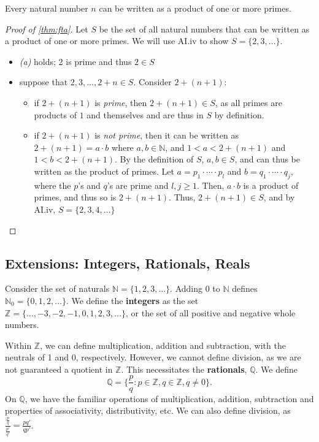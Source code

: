 \documentclass[12pt]{article}
\begin{document}
\begin{theorem}\label{thm:fta}
  Every natural number $n$ can be written as a product of one or more primes. \footnotemark
\end{theorem}
\begin{proof}[Proof of \cref{thm:fta}]
  Let $S$ be the set of all natural numbers that can be written as a product of one or more primes. We will use AI.iv to show $S = \{2, 3, \dots \}$.
  \begin{itemize}
    \item \textit{(a)} holds; 2 is prime and thus $2 \in S$
    \item suppose that $2, 3, \dots, 2 + n \in S$. Consider $2 + (n+1)$:
    \begin{itemize}
      \item if $2 + (n+1)$ is \textit{prime}, then $2 + (n+1) \in S$, as all primes are products of $1$ and themselves and are thus in $S$ by definition.
      \item if $2 + (n+1)$ is \textit{not prime}, then it can be written as $2 + (n+1) = a \cdot b$ where $a,b \in \mathbb{N}$, and $ 1 < a < 2 + (n+1)$ and $1 < b < 2 + (n+1)$. By the definition of $S$, $a,b \in S$, and can thus be written as the product of primes. Let $a = p_1 \cdot \cdots \cdot p_l$ and $b = q_1 \cdot \cdots \cdot q_j$, where the $p$'s and $q$'s are prime and $l, j \geq 1$. Then, $a\cdot b$ is a product of primes, and thus so is $2 + (n+1)$. Thus, $2 + (n+1) \in S$, and by AI.iv, $S = \{2, 3, 4, \dots\}$
    \end{itemize}
  \end{itemize}
\end{proof}

\subsection{Extensions: Integers, Rationals, Reals}

Consider the set of naturals $\mathbb{N} = \{1, 2, 3, \dots\}$. Adding $0$ to $\mathbb{N}$ defines $\mathbb{N}_0 = \{0, 1, 2, \dots\}$. We define the \textbf{integers} as the set $\mathbb{Z} = \{\dots, -3, -2, -1, 0, 1, 2, 3, \dots\}$, or the set of all positive and negative whole numbers.

Within $\mathbb{Z}$, we can define multiplication, addition and subtraction, with the neutrals of 1 and 0, respectively. However, we cannot define division, as we are not guaranteed a quotient in $\mathbb{Z}$. This necessitates the \textbf{rationals}, $\mathbb{Q}$. We define \[\mathbb{Q} = \{\frac{p}{q}: p \in \mathbb{Z}, q \in \mathbb{Z}, q \neq 0\}.\]
On $\mathbb{Q}$, we have the familiar operations of multiplication, addition, subtraction and properties of associativity, distributivity, etc. We can also define division, as $\frac{\frac{p}{q}}{\frac{p'}{q'}}= \frac{pq'}{qp'}$.
\end{document}
